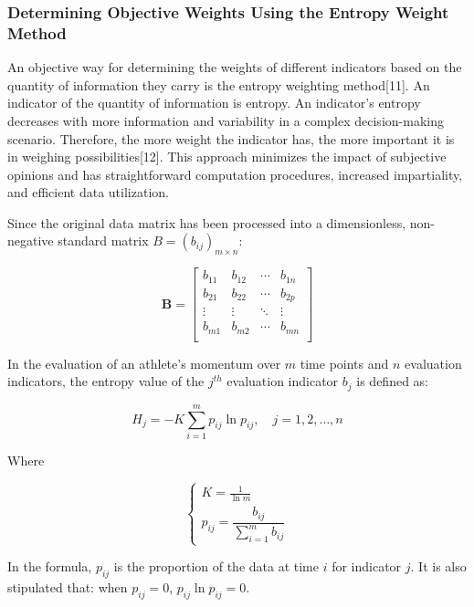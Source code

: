 \documentclass[12pt]{article}  %
\begin{document}
\subsubsection{Determining Objective Weights Using the Entropy Weight Method}

An objective way for determining the weights of different indicators based on the quantity of information they carry is the entropy weighting method[11]. An indicator of the quantity of information is entropy. An indicator's entropy decreases with more information and variability in a complex decision-making scenario. Therefore, the more weight the indicator has, the more important it is in weighing possibilities[12]. This approach minimizes the impact of subjective opinions and has straightforward computation procedures, increased impartiality, and efficient data utilization.

Since the original data matrix has been processed into a dimensionless, non-negative standard matrix \(B = (b_{ij})_{m \times n}\):

\begin{equation}
	\boldsymbol{B} =
	\begin{bmatrix}
		b_{11} & b_{12} & \cdots & b_{1n}\\
		b_{21} & b_{22} & \cdots & b_{2p}\\
		\vdots & \vdots & \ddots & \vdots\\
		b_{m1} & b_{m2} & \cdots & b_{mn}\\
	\end{bmatrix}
\end{equation}

In the evaluation of an athlete's momentum over \(m\) time points and \(n\) evaluation indicators, the entropy value of the \(j^{th}\) evaluation indicator \(b_j\) is defined as:

\begin{equation}
	H_j=-K\sum_{i=1}^m p_{ij}\ln p_{ij}, \quad j=1,2,\ldots,n
\end{equation}

Where

\begin{equation}
	\begin{cases}
		K=\frac{1}{\ln m}\\[8pt]
		p_{ij}=\dfrac{b_{ij}}{\sum_{i=1}^mb_{ij}}
	\end{cases}
\end{equation}

In the formula, \(p_{ij}\) is the proportion of the data at time \(i\) for indicator \(j\). It is also stipulated that: when \(p_{ij} = 0\), \(p_{ij} \ln p_{ij} = 0\).
\end{document}
